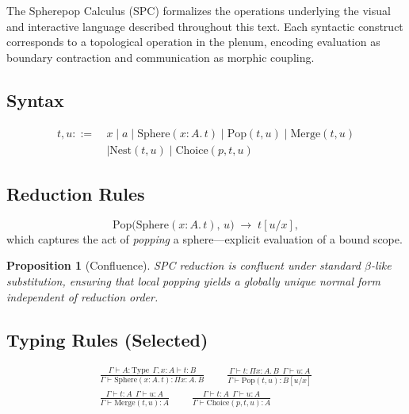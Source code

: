 \documentclass[12pt]{article}
\newtheorem{proposition}{Proposition}
\begin{document}
The Spherepop Calculus (SPC) formalizes the operations underlying the visual and interactive language described throughout this text. Each syntactic construct corresponds to a topological operation in the plenum, encoding evaluation as boundary contraction and communication as morphic coupling.

\subsection*{Syntax}
\[
\begin{aligned}
t,u ::=~& x \mid a \mid \mathrm{Sphere}(x{:}A.\,t) \mid \mathrm{Pop}(t,u) \mid \mathrm{Merge}(t,u)\\
        & \mid \mathrm{Nest}(t,u) \mid \mathrm{Choice}(p,t,u)
\end{aligned}
\]

\subsection*{Reduction Rules}
\begin{equation}
\mathrm{Pop}\big(\mathrm{Sphere}(x{:}A.\,t),\,u\big) \;\to\; t[u/x],
\end{equation}
which captures the act of \emph{popping} a sphere—explicit evaluation of a bound scope.

\begin{proposition}[Confluence]
SPC reduction is confluent under standard $\beta$-like substitution, ensuring that local popping yields a globally unique normal form independent of reduction order.
\end{proposition}

\subsection*{Typing Rules (Selected)}
\begin{align}
\frac{\Gamma \vdash A:\mathrm{Type}\ \ \Gamma,x{:}A \vdash t:B}{\Gamma \vdash \mathrm{Sphere}(x{:}A.\,t): \Pi x{:}A.\,B}
\qquad
\frac{\Gamma \vdash t:\Pi x{:}A.\,B\ \ \Gamma \vdash u{:}A}{\Gamma \vdash \mathrm{Pop}(t,u): B[u/x]}\\[1ex]
\frac{\Gamma \vdash t{:}A\ \ \Gamma \vdash u{:}A}{\Gamma \vdash \mathrm{Merge}(t,u):A}
\qquad
\frac{\Gamma \vdash t{:}A\ \ \Gamma \vdash u{:}A}{\Gamma \vdash \mathrm{Choice}(p,t,u):A}
\end{align}
\end{document}
